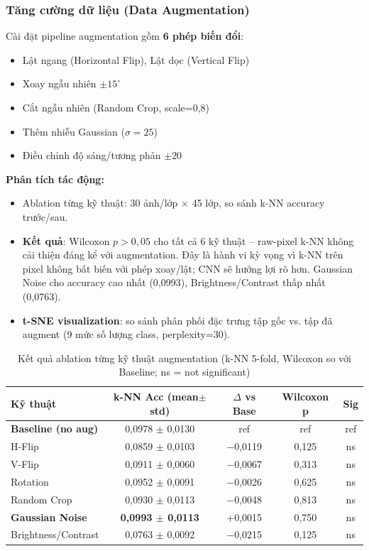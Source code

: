 \documentclass[12pt,a4paper]{article}
\let\oldtextbf\textbf
\renewcommand{\textbf}[1]{\oldtextbf{\textcolor{hcmublue}{#1}}}
\begin{document}
\subsubsection{Tăng cường dữ liệu (Data Augmentation)}

Cài đặt pipeline augmentation gồm \textbf{6 phép biến đổi}:
\begin{itemize}
    \item Lật ngang (Horizontal Flip), Lật dọc (Vertical Flip)
    \item Xoay ngẫu nhiên $\pm 15^{\circ}$
    \item Cắt ngẫu nhiên (Random Crop, scale=0,8)
    \item Thêm nhiễu Gaussian ($\sigma = 25$)
    \item Điều chỉnh độ sáng/tương phản $\pm 20$
\end{itemize}

\textbf{Phân tích tác động:}
\begin{itemize}
    \item Ablation từng kỹ thuật: 30 ảnh/lớp $\times$ 45 lớp, so sánh k-NN accuracy trước/sau. 
    \item \textbf{Kết quả}: Wilcoxon $p > 0{,}05$ cho tất cả 6 kỹ thuật -- raw-pixel k-NN không cải thiện đáng kể với augmentation. Đây là hành vi kỳ vọng vì k-NN trên pixel không bất biến với phép xoay/lật; CNN sẽ hưởng lợi rõ hơn. Gaussian Noise cho accuracy cao nhất (0{,}0993), Brightness/Contrast thấp nhất (0{,}0763).
    \item \textbf{t-SNE visualization}: so sánh phân phối đặc trưng tập gốc vs. tập đã augment (9 mức số lượng class, perplexity=30).
\end{itemize}

\begin{table}[H]
\centering
\begin{tabular}{|l|c|c|c|c|}
\hline
\textbf{Kỹ thuật} & \textbf{k-NN Acc (mean$\pm$std)} & \textbf{$\Delta$ vs Base} & \textbf{Wilcoxon p} & \textbf{Sig} \\ \hline
\textbf{Baseline (no aug)} & 0{,}0978 $\pm$ 0{,}0130 & ref & ref & ref \\ \hline
H-Flip              & 0{,}0859 $\pm$ 0{,}0103 & $-$0{,}0119 & 0{,}125 & ns \\ \hline
V-Flip              & 0{,}0911 $\pm$ 0{,}0060 & $-$0{,}0067 & 0{,}313 & ns \\ \hline
Rotation            & 0{,}0952 $\pm$ 0{,}0091 & $-$0{,}0026 & 0{,}625 & ns \\ \hline
Random Crop         & 0{,}0930 $\pm$ 0{,}0113 & $-$0{,}0048 & 0{,}813 & ns \\ \hline
\textbf{Gaussian Noise} & \textbf{0{,}0993 $\pm$ 0{,}0113} & $+$0{,}0015 & 0{,}750 & ns \\ \hline
Brightness/Contrast & 0{,}0763 $\pm$ 0{,}0092 & $-$0{,}0215 & 0{,}125 & ns \\ \hline
\end{tabular}
\caption{Kết quả ablation từng kỹ thuật augmentation (k-NN 5-fold, Wilcoxon so với Baseline; ns = not significant)}
\label{tab:aug_ablation}
\end{table}
\end{document}
